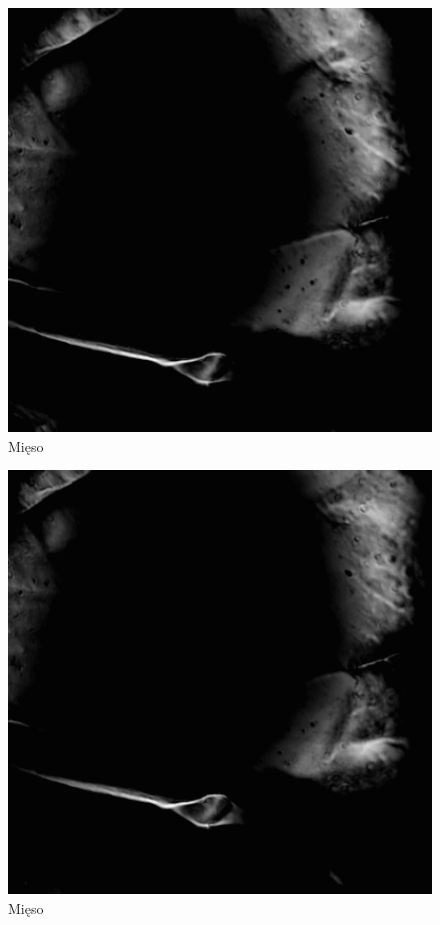 \documentclass[a4paper,12pt]{article}
\begin{document}
\begin{figure} [H]
  \begin{center}
    \includegraphics[width = 15cm]{data/MIESO2.png}
    \caption{Mięso}
  \end{center}
\end{figure}


\begin{figure} [H]
  \begin{center}
    \includegraphics[width = 15cm]{data/MIESO3.png}
    \caption{Mięso}
  \end{center}
\end{figure}
\end{document}
